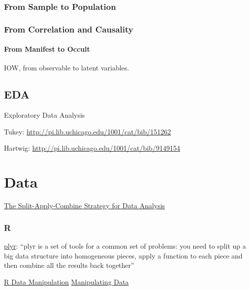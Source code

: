 \documentclass[reqno,12pt]{tufte-book}
\numberwithin{equation}{subsection}
\begin{document}
\section{From Sample to Population}

\section{From Correlation and Causality}

\subsection{From Manifest to Occult}

IOW, from observable to latent variables.

\chapter{EDA}

Exploratory Data Analysis

Tukey: \url{http://pi.lib.uchicago.edu/1001/cat/bib/151262}

Hartwig: \url{http://pi.lib.uchicago.edu/1001/cat/bib/9149154}

\part{Data}

\href{http://www.jstatsoft.org/v40/i01}{The Split-Apply-Combine Strategy for Data Analysis}


\section{R}
\label{sect:r}

\href{http://plyr.had.co.nz/}{plyr}: ``plyr is a set of tools for a
common set of problems: you need to split up a big data structure into
homogeneous pieces, apply a function to each piece and then combine
all the results back together''


\href{http://rprogramming.net/r-data-manipulation/}{R Data Manipulation}
\href{http://www.cookbook-r.com/Manipulating\_data/}{Manipulating Data}

\end{document}
